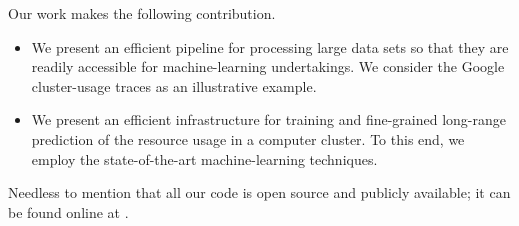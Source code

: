 Our work makes the following contribution.
\begin{itemize}
\item We present an efficient pipeline for processing large data sets so that
they are readily accessible for machine-learning undertakings. We consider the
Google cluster-usage traces \cite{reiss2011} as an illustrative example.

\item We present an efficient infrastructure for training and fine-grained
long-range prediction of the resource usage in a computer cluster. To this end,
we employ the state-of-the-art machine-learning techniques.
\end{itemize}
Needless to mention that all our code is open source and publicly available; it
can be found online at \cite{sources}.
